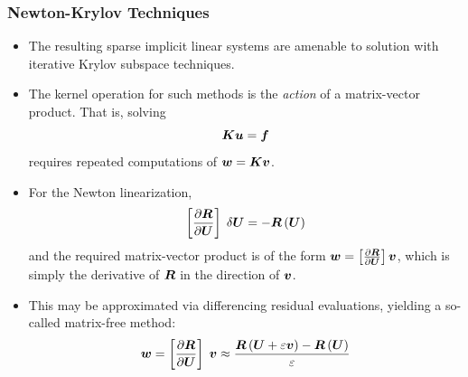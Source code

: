 \documentclass[compress,11pt]{beamer}
\begin{document}
\frame
{
  \frametitle{\scriptsize Newton-Krylov Techniques}
  \vspace{-1em}
  \footnotesize
  
  \begin{itemize}
    \item The resulting sparse implicit linear systems are amenable to solution with iterative Krylov subspace techniques.
    \item The kernel operation for such methods is the \emph{action} of a matrix-vector product.  That is, solving
      \begin{equation*}
	{\boldsymbol{K}} {\boldsymbol{u}} = {\boldsymbol{f}}
      \end{equation*}
      requires repeated computations of ${\boldsymbol{w}}={\boldsymbol{K}}{\boldsymbol{v}}$.
    \item For the Newton linearization,
      \begin{equation*}
	\left[{\frac{\partial{{\boldsymbol{R}}}}{\partial{{\boldsymbol{U}}}}}\right]\;\delta{\boldsymbol{U}} = -{\boldsymbol{R}}\left({\boldsymbol{U}}\right)
      \end{equation*}
      and the required matrix-vector product is of the form ${\boldsymbol{w}}=\left[{\frac{\partial{{\boldsymbol{R}}}}{\partial{{\boldsymbol{U}}}}}\right]{\boldsymbol{v}}$, which is simply the derivative of ${\boldsymbol{R}}$ in the direction of ${\boldsymbol{v}}$.
    \item This may be approximated via differencing residual evaluations, yielding a so-called matrix-free method:
      \begin{equation*}
	{\boldsymbol{w}} = \left[{\frac{\partial{{\boldsymbol{R}}}}{\partial{{\boldsymbol{U}}}}}\right]\;{\boldsymbol{v}} \approx \frac{{\boldsymbol{R}}\left({\boldsymbol{U}} + \varepsilon {\boldsymbol{v}}\right) - {\boldsymbol{R}}\left({\boldsymbol{U}}\right)}{\varepsilon}
	\label{eq:comp_linsolve_mf}
      \end{equation*}
  \end{itemize}
}
\end{document}
